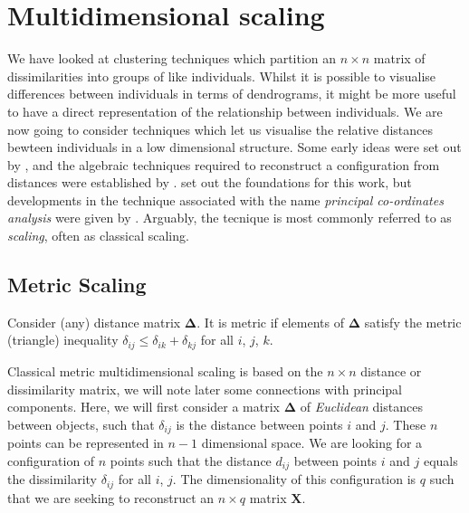 \chapter{Multidimensional scaling}
\label{mds}



We have looked at clustering techniques which partition an $n \times n$ matrix of dissimilarities into groups of like individuals.   Whilst it is possible to visualise differences between individuals in terms of dendrograms, it might be more useful to have a direct representation of the relationship between individuals.   We are now going to consider techniques which let us visualise the relative distances bewteen individuals in a low dimensional structure.  Some early ideas were set out by \cite{Richardson:1938}, and the algebraic techniques required to reconstruct a configuration from distances were established by \cite{Young+Householder:1938}.   \cite{Torgerson:1952} set out the foundations for this work, but developments in the technique associated with the name \emph{principal co-ordinates analysis} were given by \cite{Gower:1966}.   Arguably, the tecnique is most commonly referred to as \emph{scaling}, often as classical scaling.

\section{Metric Scaling}

Consider (any) distance matrix $\boldsymbol{\Delta}$.   It is metric if elements of $\boldsymbol{\Delta}$ satisfy the metric (triangle) inequality $\delta_{ij} \leq \delta_{ik} + \delta_{kj}$ for all $i$, $j$, $k$.

Classical metric multidimensional scaling is based on the $n \times n$ distance or dissimilarity matrix, we will note later some connections with principal components.   Here, we will first consider a matrix $\boldsymbol{\Delta}$ of \emph{Euclidean} distances between objects, such that $\delta_{ij}$ is the distance between points $i$ and $j$.   These $n$ points can be represented in $n-1$ dimensional space.   We are looking for a configuration of $n$ points such that the distance $d_{ij}$ between points $i$ and $j$ equals the dissimilarity $\delta_{ij}$ for all $i$, $j$.   The dimensionality of this configuration is $q$ such that we are seeking to reconstruct an $n \times q$ matrix $\boldsymbol{X}$.

